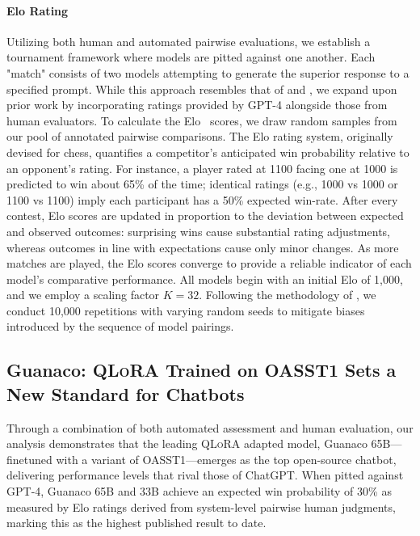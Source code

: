 \paragraph{Elo Rating} Utilizing both human and automated pairwise evaluations, we establish a tournament framework where models are pitted against one another. Each "match" consists of two models attempting to generate the superior response to a specified prompt. While this approach resembles that of \citet{bai2022training} and \citet{vicuna2023}, we expand upon prior work by incorporating ratings provided by GPT-4 alongside those from human evaluators. To calculate the Elo~\citep{elo1967proposed,elo1978rating} scores, we draw random samples from our pool of annotated pairwise comparisons. The Elo rating system, originally devised for chess, quantifies a competitor's anticipated win probability relative to an opponent’s rating. For instance, a player rated at 1100 facing one at 1000 is predicted to win about 65\% of the time; identical ratings (e.g., 1000 vs 1000 or 1100 vs 1100) imply each participant has a 50\% expected win-rate. After every contest, Elo scores are updated in proportion to the deviation between expected and observed outcomes: surprising wins cause substantial rating adjustments, whereas outcomes in line with expectations cause only minor changes. As more matches are played, the Elo scores converge to provide a reliable indicator of each model’s comparative performance. All models begin with an initial Elo of 1,000, and we employ a scaling factor $K=32$. Following the methodology of \citet{vicuna2023}, we conduct 10,000 repetitions with varying random seeds to mitigate biases introduced by the sequence of model pairings.

\subsection{\textbf{Guanaco}: \textsc{QLoRA} Trained on OASST1 Sets a New Standard for Chatbots} 

Through a combination of both automated assessment and human evaluation, our analysis demonstrates that the leading \textsc{QLoRA} adapted model, {Guanaco} 65B—finetuned with a variant of OASST1—emerges as the top open-source chatbot, delivering performance levels that rival those of ChatGPT. When pitted against GPT-4, {Guanaco} 65B and 33B achieve an expected win probability of 30\% as measured by Elo ratings derived from system-level pairwise human judgments, marking this as the highest published result to date.

